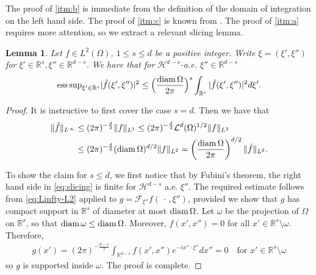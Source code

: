 \documentclass[a4paper, 10pt, twoside, notitlepage]{amsart}
\theoremstyle{plain}
\newtheorem{lem}[prop]{Lemma}
\newcommand{\R}{\mathbb{R}}
\newcommand{\diam}{\textup{diam}}
\begin{document}
		
		
		The proof of \cref{itm:b} is immediate from the definition of the domain of integration on the left hand side. The proof of \cref{itm:c} is known from \cite{KKO13}. The proof of
		\cref{itm:a} requires more attention, so we extract a relevant slicing lemma.
		\begin{lem}\label{lem:slicing}
			Let $f\in L^2(\Omega)$, $1\leq s\leq d$ be a positive integer. Write $\xi=(\xi',\xi'')$ for $\xi'\in\R^s, \xi'' \in \R^{d-s}$. We have that for $\mathcal H^{d-s}$-a.e. $\xi''\in\R^{d-s}$
			\begin{align} \label{eq:slicing}
                          {\mathrm{ess\,sup}_{\xi'\in\R^s}}|\hat f(\xi',\xi'')|^2\leq \Big(\frac{\diam\,\Omega}{2\pi}\Big)^{s}\int_{\R^s}|\hat f(\xi',\xi'')|^2 d\xi'.
			\end{align}
		\end{lem}
		\begin{proof}
			It is instructive to first cover the case $s=d$. Then we have that
			\begin{align}\label{eq:Linfty-L2}
                          \begin{split}
				\|\hat f\|_{L^\infty} &\leq (2\pi)^{-\frac{d}{2}}\|f\|_{L^1} \leq (2\pi)^{-\frac{d}{2}} \mathcal L^d( \Omega)^{1/2}\|f\|_{L^2} \\
                                                      & \leq (2\pi)^{-\frac{d}{2}} (\diam \,\Omega)^{d/2}\|f\|_{L^2} = \left(\frac{\diam \,\Omega}{2 \pi}\right)^{d/2}\|\hat f\|_{L^2}.
                                                        \end{split}
			\end{align}
			
			To show the claim for $s \leq d$, we first notice that by Fubini's theorem, the right hand side in \cref{eq:slicing} is finite for $\mathcal H^{d-s}$ a.e. $\xi''$. The required estimate follows from
			\cref{eq:Linfty-L2} applied to $g=\mathcal F_{\xi''}f(\,\cdot\,,\xi'')$, provided we show that $g$ has compact support in $\R^s$ of diameter at most $\diam\, \Omega$. Let $\omega$ be the
			projection of $\Omega$ on $\R^s$, so that $\diam\,\omega\leq \diam\,\Omega$. Moreover, $f(x',x'')=0$ for all $x'\in\R^s\setminus\omega$. Therefore,
			\begin{align*}
			g(x')=(2\pi)^{-\frac{d-s}{2}}\int_{\R^{d-s}}f(x',x'')e^{-ix''\cdot\xi''}dx''=0\quad \text{for } x'\in\R^s\setminus\omega
                        \end{align*}
			so $g$ is supported inside $\omega$. The proof is complete.
		\end{proof}
\end{document}
